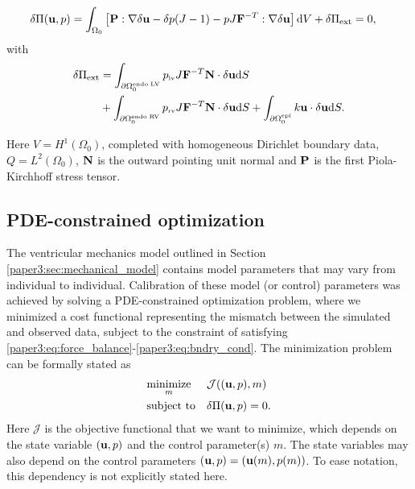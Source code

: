 \begin{align}
  \delta\Pi(\mathbf{u}, p) &=
  \int_{\Omega_0} \left[ \mathbf{P}: \nabla \delta \mathbf{u}  - \delta p (J - 1 ) - pJ\mathbf{F}^{-T}:\nabla \delta \mathbf{u} \right] \mathrm{d}V
  + \delta\Pi_{\text{ext}} = 0,
  \label{paper3:eq:force_balance}
\end{align}
with
\begin{align}
  \begin{split}
  \delta \Pi_{\text{ext}} &=
  \int_{\partial \Omega_0^{\mathrm{endo} \; \mathrm{LV}}} p_{\textnormal{\tiny{lv}}} J \mathbf{F}^{-T} \mathbf{N} \cdot \delta \mathbf{u} \mathrm{d}S \\ &+
  \int_{\partial \Omega_0^{\mathrm{endo} \; \mathrm{RV}}} p_{\textnormal{\tiny{rv}}} J \mathbf{F}^{-T} \mathbf{N} \cdot \delta \mathbf{u} \mathrm{d}S +
  \int_{\partial \Omega_0^{\mathrm{epi}}} k \mathbf{u} \cdot \delta \mathbf{u} \mathrm{d}S.
 \end{split}
  \label{paper3:eq:bndry_cond}
\end{align}

\noindent
Here $V = H^1(\Omega_0)$, completed with homogeneous Dirichlet boundary
data, $Q = L^2(\Omega_0)$, $ \mathbf{N} $ is the outward pointing unit normal
and  $\mathbf{P}$ is the first Piola-Kirchhoff stress tensor.

\subsection{PDE-constrained optimization}
The ventricular mechanics model outlined in Section \ref{paper3:sec:mechanical_model}
contains model parameters that may vary from individual to
individual.
Calibration of these model (or control) parameters was achieved by solving a
PDE-constrained optimization problem, where we minimized a cost functional
representing the mismatch between the simulated and
observed data, subject to the constraint of satisfying
\eqref{paper3:eq:force_balance}-\eqref{paper3:eq:bndry_cond}.
The minimization problem can be formally stated as
\begin{equation}
  \begin{aligned}
    \label{paper3:eq:optimization_problem}
    & \underset{m}{\text{minimize}}
    & &  \mathcal{J}((\mathbf{u}, p), m) \\
    & \text{subject to}
    & & \delta \Pi(\mathbf{u}, p) = 0.
  \end{aligned}
\end{equation}
Here $\mathcal{J}$ is the objective functional that we want to
minimize, which depends on the state variable $(\mathbf{u}, p)$ and the
control parameter(s) $m$. The state variables may also depend on the
control parameters $(\mathbf{u}, p) = (\mathbf{u}(m), p(m))$. To ease
notation, this dependency is not explicitly stated here.

